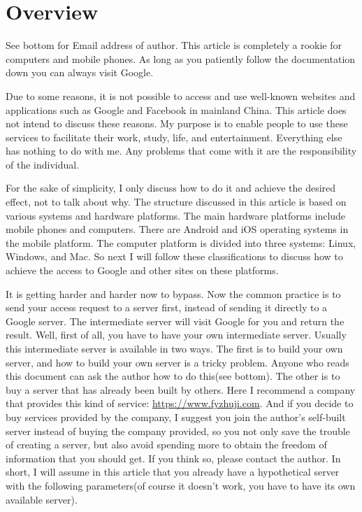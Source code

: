 \documentclass[12pt]{wx672article}
\begin{document}
\section*{Overview}
\label{sec:org2217820}
See bottom for Email address of author. This article is completely a rookie for computers
and mobile phones. As long as you patiently follow the documentation down you can always
visit Google.

Due to some reasons, it is not possible to access and use well-known websites and
applications such as Google and Facebook in mainland China. This article does not intend
to discuss these reasons. My purpose is to enable people to use these services to
facilitate their work, study, life, and entertainment. Everything else has nothing to do
with me. Any problems that come with it are the responsibility of the individual.

For the sake of simplicity, I only discuss how to do it and achieve the desired effect,
not to talk about why. The structure discussed in this article is based on various systems
and hardware platforms. The main hardware platforms include mobile phones and
computers. There are Android and iOS operating systems in the mobile platform. The
computer platform is divided into three systems: Linux, Windows, and Mac. So next I will
follow these classifications to discuss how to achieve the access to Google and other
sites on these platforms.

It is getting harder and harder now to bypass. Now the common practice is to send your
access request to a server first, instead of sending it directly to a Google server. The
intermediate server will visit Google for you and return the result. Well, first of all,
you have to have your own intermediate server. Usually this intermediate server is
available in two ways. The first is to build your own server, and how to build your own
server is a tricky problem. Anyone who reads this document can ask the author how to do
this(see bottom). The other is to buy a server that has already been built by others. Here
I recommend a company that provides this kind of service: \url{https://www.fyzhuji.com}. And if
you decide to buy services provided by the company, I suggest you join the author's
self-built server instead of buying the company provided, so you not only save the trouble
of creating a server, but also avoid spending more to obtain the freedom of information
that you should get. If you think so, please contact the author. In short, I will assume
in this article that you already have a hypothetical server with the following
parameters(of course it doesn't work, you have to have its own available server).
\end{document}

